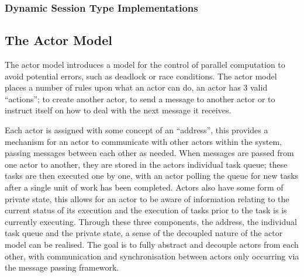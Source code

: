 \documentclass{article}
\begin{document}
	\subsubsection{Dynamic Session Type Implementations}
	\subsection{The Actor Model}
	The actor model introduces a model for the control of parallel computation to avoid potential errors, such as deadlock or race conditions. The actor model places a number of rules upon what an actor can do, an actor has 3 valid “actions”; to create another actor, to send a message to another actor or to instruct itself on how to deal with the next message it receives.
	
	Each actor is assigned with some concept of an “address”, this provides a mechanism for an actor to communicate with other actors within the system, passing messages between each other as needed. When messages are passed from one actor to another, they are stored in the actors individual task queue; these tasks are then executed one by one, with an actor polling the queue for new tasks after a single unit of work has been completed. Actors also have some form of private state, this allows for an actor to be aware of information relating to the current status of its execution and the execution of tasks prior to the task is is currently executing. Through these three components, the address, the individual task queue and the private state, a sense of the decoupled nature of the actor model can be realised. The goal is to fully abstract and decouple actors from each other, with communication and synchronisation between actors only occurring via the message passing framework.
	
\end{document}
